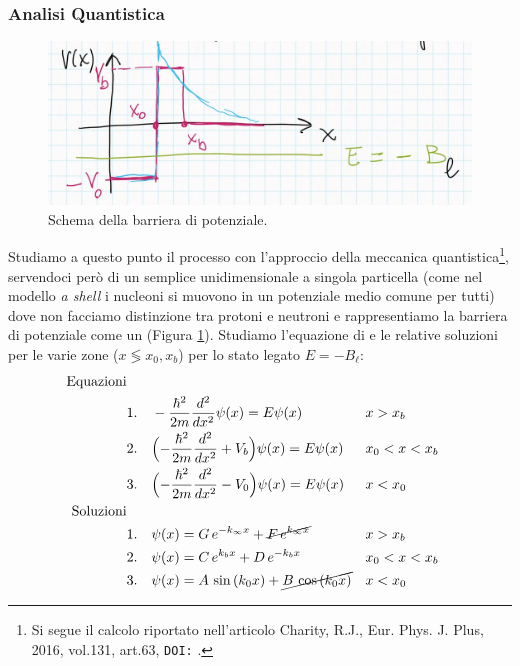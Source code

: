 \subsubsection{Analisi Quantistica}
\begin{figure}[h]
    \centering
    \includegraphics[scale=0.2]{Immagini/0325_pot.png}
    \caption{Schema della barriera di potenziale.}
    \label{0325_pot}
\end{figure}
\noindent Studiamo a questo punto il processo con l'approccio della meccanica quantistica\footnote{\label{0325_art}Si segue il calcolo riportato nell'articolo Charity, R.J., Eur. Phys. J. Plus, 2016, vol.131, art.63, \texttt{DOI:} .}, servendoci però di un semplice  unidimensionale a singola particella (come nel modello \textit{a shell} i nucleoni si muovono in un potenziale medio comune per tutti) dove non facciamo distinzione tra protoni e neutroni e rappresentiamo la barriera di potenziale come un  (Figura \ref{0325_pot}). Studiamo l'equazione di \Sch{} e le relative soluzioni per le varie zone ($x\lessgtr x_0,x_b$) per lo stato legato $E=-B_\ell$:
\begin{displaymath}
\begin{aligned}
\text{Equazioni}& & & \\
&1. & &-\frac{\hbar^2}{2m} \frac{d^2}{dx^2} \psi(x) = E\psi(x) & &x>x_b \\
&2. & &\Bigl ( -\frac{\hbar^2}{2m} \frac{d^2}{dx^2} + V_b \Bigr ) \psi(x) = E\psi(x) & &x_0<x<x_b \\
&3. & &\Bigl ( -\frac{\hbar^2}{2m} \frac{d^2}{dx^2}-V_0 \Bigr ) \psi(x) = E\psi(x) & &x<x_0 \\
\text{Soluzioni}& & & \\
&1. & &\psi(x) = G\,e^{-k_\infty x} + \cancel{F\,e^{k_\infty x}} & &x>x_b \\
&2. & &\psi(x) = C\,e^{k_b x} + D\, e^{-k_b x} & &x_0<x<x_b \\
&3. & &\psi(x) = A\,\sin{(k_0x)} + \cancel{B\,\cos{(k_0x)}} & &x<x_0 
\end{aligned}
\end{displaymath}
